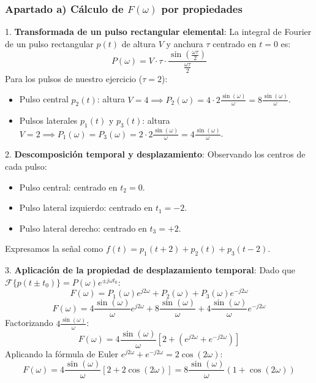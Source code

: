 \begin{resolucion}
\subsubsection*{Apartado a) Cálculo de $F(\omega)$ por propiedades}

1. \textbf{Transformada de un pulso rectangular elemental}:
   La integral de Fourier de un pulso rectangular $p(t)$ de altura $V$ y anchura $\tau$ centrado en $t=0$ es:
   \[
   P(\omega) = V \cdot \tau \cdot \frac{\sin\left(\frac{\omega \tau}{2}\right)}{\frac{\omega \tau}{2}}
   \]
   Para los pulsos de nuestro ejercicio ($\tau = 2$):
   \begin{itemize}
       \item Pulso central $p_2(t)$: altura $V=4 \implies P_2(\omega) = 4 \cdot 2 \frac{\sin(\omega)}{\omega} = 8 \frac{\sin(\omega)}{\omega}$.
       \item Pulsos laterales $p_1(t)$ y $p_3(t)$: altura $V=2 \implies P_1(\omega) = P_3(\omega) = 2 \cdot 2 \frac{\sin(\omega)}{\omega} = 4 \frac{\sin(\omega)}{\omega}$.
   \end{itemize}

2. \textbf{Descomposición temporal y desplazamiento}:
   Observando los centros de cada pulso:
   \begin{itemize}
       \item Pulso central: centrado en $t_2 = 0$.
       \item Pulso lateral izquierdo: centrado en $t_1 = -2$.
       \item Pulso lateral derecho: centrado en $t_3 = +2$.
   \end{itemize}
   Expresamos la señal como $f(t) = p_1(t+2) + p_2(t) + p_3(t-2)$.

3. \textbf{Aplicación de la propiedad de desplazamiento temporal}:
   Dado que $\mathcal{F}\{p(t \pm t_0)\} = P(\omega) e^{\pm j\omega t_0}$:
   \[
   F(\omega) = P_1(\omega) e^{j2\omega} + P_2(\omega) + P_3(\omega) e^{-j2\omega}
   \]
   \[
   F(\omega) = 4 \frac{\sin(\omega)}{\omega} e^{j2\omega} + 8 \frac{\sin(\omega)}{\omega} + 4 \frac{\sin(\omega)}{\omega} e^{-j2\omega}
   \]
   Factorizando $4 \frac{\sin(\omega)}{\omega}$:
   \[
   F(\omega) = 4 \frac{\sin(\omega)}{\omega} \left[ 2 + \left(e^{j2\omega} + e^{-j2\omega}\right) \right]
   \]
   Aplicando la fórmula de Euler $e^{j2\omega} + e^{-j2\omega} = 2\cos(2\omega)$:
   \[
   F(\omega) = 4 \frac{\sin(\omega)}{\omega} \left[ 2 + 2\cos(2\omega) \right] = 8 \frac{\sin(\omega)}{\omega} \left(1 + \cos(2\omega)\right)
   \]
\newpage

\end{resolucion}
